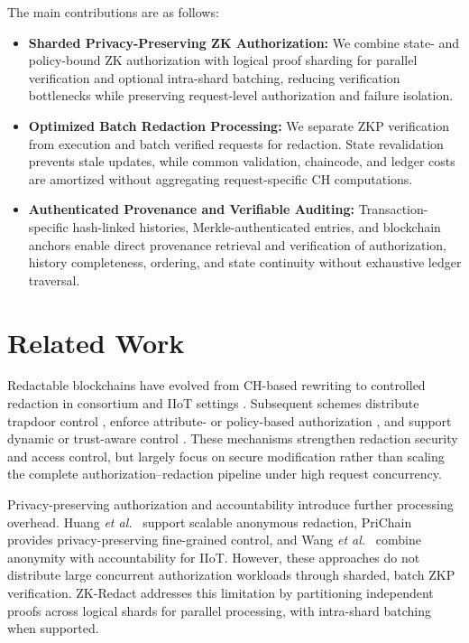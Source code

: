 \documentclass[lettersize,journal]{IEEEtran}
\begin{document}
The main contributions are as follows:
\begin{itemize}
\item \textbf{Sharded Privacy-Preserving ZK Authorization:}
We combine state- and policy-bound ZK authorization with logical proof
sharding for parallel verification and optional intra-shard batching,
reducing verification bottlenecks while preserving request-level
authorization and failure isolation.

\item \textbf{Optimized Batch Redaction Processing:}
We separate ZKP verification from execution and batch verified requests
for redaction. State revalidation prevents stale updates, while common
validation, chaincode, and ledger costs are amortized without aggregating
request-specific CH computations.

\item \textbf{Authenticated Provenance and Verifiable Auditing:}
Transaction-specific hash-linked histories, Merkle-authenticated entries,
and blockchain anchors enable direct provenance retrieval and verification
of authorization, history completeness, ordering, and state continuity
without exhaustive ledger traversal.

\end{itemize}
\section{Related Work}
\label{sec:related}

Redactable blockchains have evolved from CH-based rewriting
\cite{ref9} to controlled redaction in consortium and IIoT settings
\cite{ref2}. Subsequent schemes distribute trapdoor control
\cite{ref1,ref6,ref19}, enforce attribute- or policy-based
authorization \cite{ref15}, and support dynamic or
trust-aware control \cite{ref16}. These mechanisms strengthen
redaction security and access control, but largely focus on secure
modification rather than scaling the complete authorization--redaction
pipeline under high request concurrency.

Privacy-preserving authorization and accountability introduce further
processing overhead. Huang \emph{et al.}~\cite{ref14} support scalable
anonymous redaction, PriChain~\cite{ref4} provides privacy-preserving
fine-grained control, and Wang \emph{et al.}~\cite{ref17} combine
anonymity with accountability for IIoT. However, these approaches do not
distribute large concurrent authorization workloads through sharded,
batch ZKP verification. ZK-Redact addresses this limitation by
partitioning independent proofs across logical shards for parallel
processing, with intra-shard batching when supported.
\end{document}
